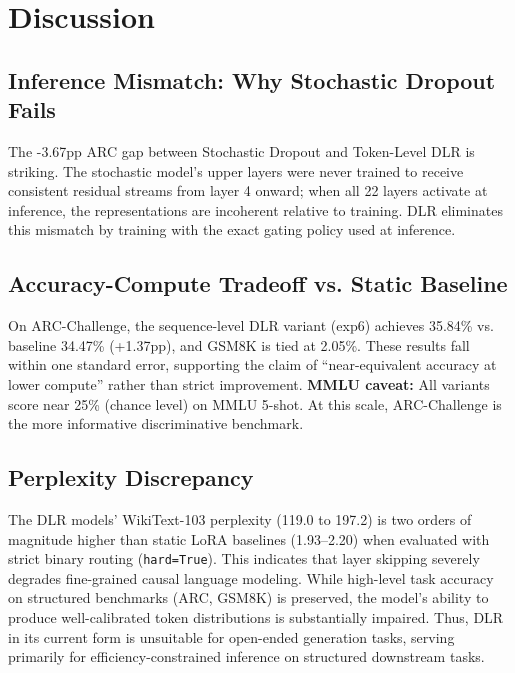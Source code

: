 \documentclass[conference]{IEEEtran}
\begin{document}
\section{Discussion}
\subsection{Inference Mismatch: Why Stochastic Dropout Fails}
The -3.67pp ARC gap between Stochastic Dropout and Token-Level DLR is striking. The stochastic model's upper layers were never trained to receive consistent residual streams from layer 4 onward; when all 22 layers activate at inference, the representations are incoherent relative to training. DLR eliminates this mismatch by training with the exact gating policy used at inference.

\subsection{Accuracy-Compute Tradeoff vs. Static Baseline}
On ARC-Challenge, the sequence-level DLR variant (exp6) achieves 35.84\% vs. baseline 34.47\% (+1.37pp), and GSM8K is tied at 2.05\%. These results fall within one standard error, supporting the claim of ``near-equivalent accuracy at lower compute'' rather than strict improvement. \textbf{MMLU caveat:} All variants score near 25\% (chance level) on MMLU 5-shot. At this scale, ARC-Challenge is the more informative discriminative benchmark.

\subsection{Perplexity Discrepancy}
The DLR models' WikiText-103 perplexity (119.0 to 197.2) is two orders of magnitude higher than static LoRA baselines (1.93--2.20) when evaluated with strict binary routing (\texttt{hard=True}). This indicates that layer skipping severely degrades fine-grained causal language modeling. While high-level task accuracy on structured benchmarks (ARC, GSM8K) is preserved, the model's ability to produce well-calibrated token distributions is substantially impaired. Thus, DLR in its current form is unsuitable for open-ended generation tasks, serving primarily for efficiency-constrained inference on structured downstream tasks.
\end{document}
